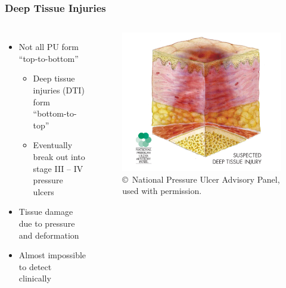 \documentclass{beamer}
\begin{document}
		\begin{frame}
			\frametitle{Deep Tissue Injuries}
			\begin{columns}[c]
				\begin{itemize}
					\item Not all PU form ``top-to-bottom''
					\begin{itemize}
						\item Deep tissue injuries (\alert{DTI}) form ``bottom-to-top''
						\item Eventually break out into stage III -- IV pressure ulcers
					\end{itemize}

					\item Tissue damage due to pressure and deformation

					\item Almost impossible to detect clinically
				\end{itemize}

					\begin{figure}
						\centering
						\includegraphics[width=\textwidth]{../latex/assets/npuap/suspectedDTI.png}

						\caption{\copyright\ National Pressure Ulcer Advisory Panel, used with permission.}
					\end{figure}
			\end{columns}
		\end{frame}
\end{document}
